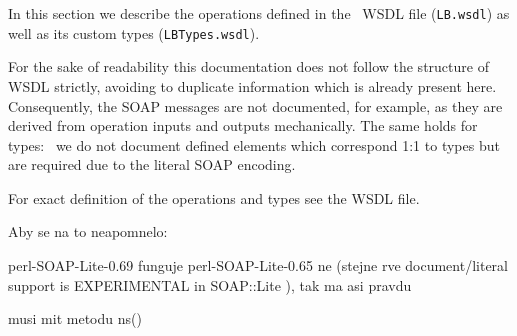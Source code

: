 
In this section we describe the operations defined in the \LB\ WSDL
file (\texttt{LB.wsdl}) as well as its custom types (\texttt{LBTypes.wsdl}).

For the sake of readability this documentation does not follow the structure
of WSDL strictly, avoiding to duplicate information which is already present
here. Consequently, the SOAP messages are not documented, for example, as they
are derived from operation inputs and outputs mechanically.
The same holds for types: \eg\ we do not document defined elements
which correspond 1:1 to types but are required due to the literal SOAP
encoding.

For exact definition of the operations and types see the WSDL file.



Aby se na to neapomnelo:

perl-SOAP-Lite-0.69 funguje
perl-SOAP-Lite-0.65 ne 	(stejne rve document/literal support is EXPERIMENTAL in SOAP::Lite ), tak ma asi pravdu


musi mit metodu ns()


